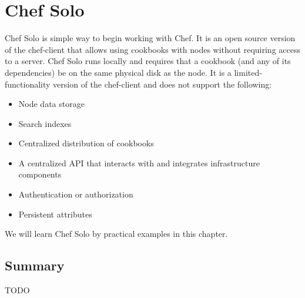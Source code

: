 \chapter{Chef Solo}

Chef Solo is simple way to begin working with Chef. It is an open source version of the chef-client that allows using cookbooks with nodes without requiring access to a server. Chef Solo runs locally and requires that a cookbook (and any of its dependencies) be on the same physical disk as the node. It is a limited-functionality version of the chef-client and does not support the following:

\begin{itemize}
  \item Node data storage
  \item Search indexes
  \item Centralized distribution of cookbooks
  \item A centralized API that interacts with and integrates infrastructure components
  \item Authentication or authorization
  \item Persistent attributes
\end{itemize}

We will learn Chef Solo by practical examples in this chapter.




\section{Summary}

TODO